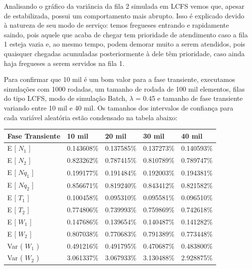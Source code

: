 \documentclass[a4paper,10pt]{article}
\begin{document}
    Analisando o gráfico da variância da fila 2 simulada em LCFS vemos que, apesar de estabilizada, possui um comportamento mais abrupto. Isso é explicado devido à natureza de seu modo de serviço: temos fregueses entrando e rapidamente saindo, pois aquele que acaba de chegar tem prioridade de atendimento caso a fila 1 esteja vazia e, ao mesmo tempo, podem demorar muito a serem atendidos, pois quaisquer chegadas acumuladas posteriormente à dele têm prioridade, caso ainda haja fregueses a serem servidos na fila 1.

    Para confirmar que 10 mil é um bom valor para a fase transiente, executamos simulações com 1000 rodadas, um tamanho de rodada de 100 mil elementos, filas do tipo LCFS, modo de simulação Batch, $\lambda$ = 0.45 e tamanho de fase transiente variando entre 10 mil e 40 mil. Os tamanhos dos intervalos de confiança para cada variável aleatória estão condensado na tabela abaixo:

\begin{center}
\begin{tabular} { | l | l | l | l | l | }
    \hline
    Fase Transiente & 10 mil     & 20 mil     & 30 mil     & 40 mil \\ \hline
    E [ $N_1$ ]     & 0.143608\% & 0.137585\% & 0.137273\% & 0.140593\% \\ \hline
    E [ $N_2$ ]     & 0.823262\% & 0.787415\% & 0.810789\% & 0.789747\% \\ \hline
    E [ $Nq_1$ ]    & 0.199177\% & 0.191484\% & 0.192003\% & 0.194381\% \\ \hline
    E [ $Nq_2$ ]    & 0.856671\% & 0.819240\% & 0.843412\% & 0.821582\% \\ \hline
    E [ $T_1$ ]     & 0.100458\% & 0.095310\% & 0.095581\% & 0.096510\% \\ \hline
    E [ $T_2$ ]     & 0.774806\% & 0.739993\% & 0.759869\% & 0.742618\% \\ \hline
    E [ $W_1$ ]     & 0.147686\% & 0.139654\% & 0.140487\% & 0.141282\% \\ \hline
    E [ $W_2$ ]     & 0.807038\% & 0.770683\% & 0.791389\% & 0.773448\% \\ \hline
    Var ( $W_1$ )   & 0.491216\% & 0.491795\% & 0.470687\% & 0.483800\% \\ \hline
    Var ( $W_2$ )   & 3.061337\% & 3.067933\% & 3.130488\% & 2.928875\% \\ \hline
\end{tabular}
\end{center}
\end{document}
